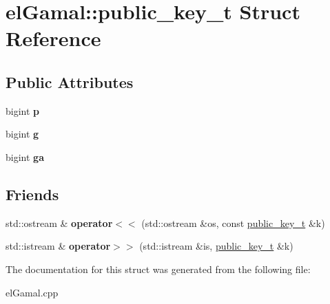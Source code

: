 \hypertarget{structelGamal_1_1public__key__t}{}\section{el\+Gamal\+:\+:public\+\_\+key\+\_\+t Struct Reference}
\label{structelGamal_1_1public__key__t}
\subsection*{Public Attributes}
\begin{DoxyCompactItemize}
\item 
\mbox{\label{structelGamal_1_1public__key__t_a0f62fb91be391d0ca4abfa147626a0c8}} 
bigint {\bfseries p}
\item 
\mbox{\label{structelGamal_1_1public__key__t_aa54f804adb7e54538f1e34e7737167e7}} 
bigint {\bfseries g}
\item 
\mbox{\label{structelGamal_1_1public__key__t_ad3a62139e6cffaffbb03178eff18ea76}} 
bigint {\bfseries ga}
\end{DoxyCompactItemize}
\subsection*{Friends}
\begin{DoxyCompactItemize}
\item 
\mbox{\label{structelGamal_1_1public__key__t_a046edae80d5819c231b4c2dc64986202}} 
std\+::ostream \& {\bfseries operator$<$$<$} (std\+::ostream \&os, const \mbox{\hyperlink{structelGamal_1_1public__key__t}{public\+\_\+key\+\_\+t}} \&k)
\item 
\mbox{\label{structelGamal_1_1public__key__t_a9d8e3db0096733e107dfb53f121c9e8e}} 
std\+::istream \& {\bfseries operator$>$$>$} (std\+::istream \&is, \mbox{\hyperlink{structelGamal_1_1public__key__t}{public\+\_\+key\+\_\+t}} \&k)
\end{DoxyCompactItemize}


The documentation for this struct was generated from the following file\+:\begin{DoxyCompactItemize}
\item 
el\+Gamal.\+cpp\end{DoxyCompactItemize}
